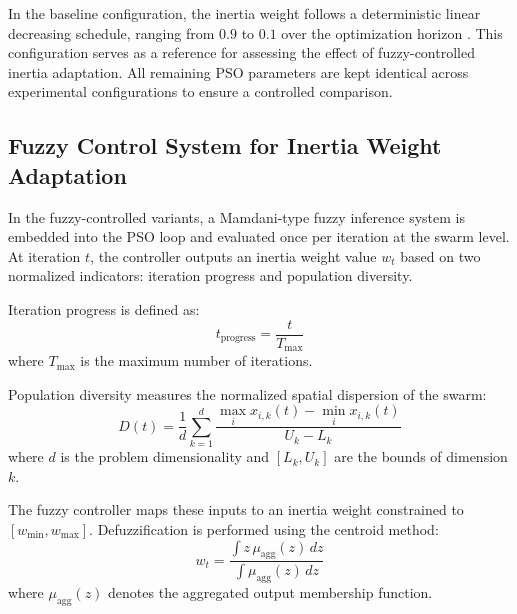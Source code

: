 \documentclass[runningheads]{llncs}
\begin{document}
In the baseline configuration, the inertia weight follows a deterministic linear decreasing schedule, ranging from $0.9$ to $0.1$ over the optimization horizon \cite{abualigah2021arithmetic}. This configuration serves as a reference for assessing the effect of fuzzy-controlled inertia adaptation. All remaining PSO parameters are kept identical across experimental configurations to ensure a controlled comparison.



\vspace{-0.25cm}
\subsection{Fuzzy Control System for Inertia Weight Adaptation}

In the fuzzy-controlled variants, a Mamdani-type fuzzy inference system is embedded into the PSO loop and evaluated once per iteration at the swarm level. At iteration $t$, the controller outputs an inertia weight value $w_t$ based on two normalized indicators: iteration progress and population diversity.

Iteration progress is defined as:
\vspace{-0.25cm}
\begin{equation}
    t_{\text{progress}} = \frac{t}{T_{\max}}
    \label{eq:iteration_progress}
\end{equation}
where $T_{\max}$ is the maximum number of iterations. 

Population diversity measures the normalized spatial dispersion of the swarm:
\vspace{-0.25cm}
\begin{equation}
    D(t) = \frac{1}{d} \sum_{k=1}^{d}
    \frac{\max_i x_{i,k}(t) - \min_i x_{i,k}(t)}{U_k - L_k}
    \label{eq:diversity_metric}
\end{equation}
where $d$ is the problem dimensionality and $[L_k, U_k]$ are the bounds of dimension $k$.

The fuzzy controller maps these inputs to an inertia weight constrained to $[w_{\min}, w_{\max}]$. Defuzzification is performed using the centroid method:
\vspace{-0.25cm}
\begin{equation}
    w_t = \frac{\int z \, \mu_{\text{agg}}(z)\, dz}{\int \mu_{\text{agg}}(z)\, dz}
    \label{eq:defuzzification}
\end{equation}
where $\mu_{\text{agg}}(z)$ denotes the aggregated output membership function.
\end{document}
